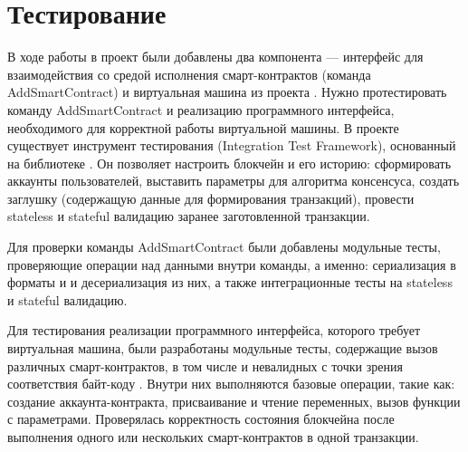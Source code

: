 \section{Тестирование}
В ходе работы в проект были добавлены два компонента --- интерфейс для взаимодействия со средой исполнения смарт-контрактов (команда AddSmartContract) и виртуальная машина из проекта .
Нужно протестировать команду AddSmartContract и реализацию программного интерфейса, необходимого для корректной работы виртуальной машины.
В проекте  существует инструмент тестирования  (Integration Test Framework), основанный на библиотеке .
Он позволяет настроить блокчейн и его историю: сформировать аккаунты пользователей, выставить параметры для алгоритма консенсуса, создать заглушку (содержащую данные для формирования транзакций), провести stateless и stateful валидацию заранее заготовленной транзакции.

Для проверки команды Add\-Smart\-Con\-tract были добавлены модульные тесты, проверяющие операции над данными внутри команды, а именно: сериализация в форматы  и  и десериализация из них, а также интеграционные тесты на stateless и stateful валидацию.

Для тестирования реализации программного интерфейса, которого требует виртуальная машина, были разработаны модульные тесты, содержащие вызов различных смарт-контрактов, в том числе и невалидных с точки зрения соответствия байт-коду .
Внутри них выполняются базовые операции, такие как: создание аккаунта-контракта, присваивание и чтение переменных, вызов функции с параметрами.
Проверялась корректность состояния блокчейна после выполнения одного или нескольких смарт-контрактов в одной транзакции.